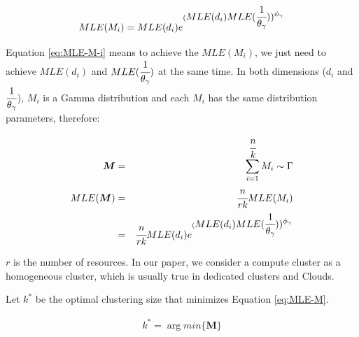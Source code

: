 \documentclass{IOS-Book-Article}
\begin{document}
\begin{equation} 
\label{eq:MLE-M-i}
MLE(M_i)=MLE(d_i)e^{(\displaystyle MLE(d_i)MLE(\cfrac{1}{\theta_{\gamma}}))^{\phi_{\gamma}}} 
\end{equation}

Equation \ref{eq:MLE-M-i} means to achieve the $MLE(M_i)$, we just need to achieve $MLE(d_i)$ and $MLE(\cfrac{1}{\theta_{\gamma}})$ at the same time. 
In both dimensions ($d_i$ and $\displaystyle\cfrac{1}{\theta_{\gamma}}$), $M_i$ is a Gamma distribution and each $M_i$ has the same distribution parameters, therefore:

\begin{eqnarray} 
\label{eq:MLE-M}
\bm{M}&=&\displaystyle\sum_{i=1}^{\cfrac{n}{k}}M_i\sim\Gamma \nonumber\\
MLE(\bm{M})&=&\displaystyle\cfrac{n}{rk}MLE(M_i)\\
&=&\displaystyle\cfrac{n}{rk} MLE(d_i)e^{(\displaystyle MLE(d_i)MLE(\cfrac{1}{\theta_{\gamma}}))^{\phi_{\gamma}}} 
\end{eqnarray}

$r$ is the number of resources. In our paper, we consider a compute cluster as a homogeneous cluster, which is usually true in dedicated clusters and Clouds. 




Let $k^*$ be the optimal clustering size that minimizes Equation \ref{eq:MLE-M}.  

\begin{eqnarray} 
\label{eq:k_optimal}
k^*=\arg min\{\bm{M}\} \nonumber
\end{eqnarray}
\end{document}
